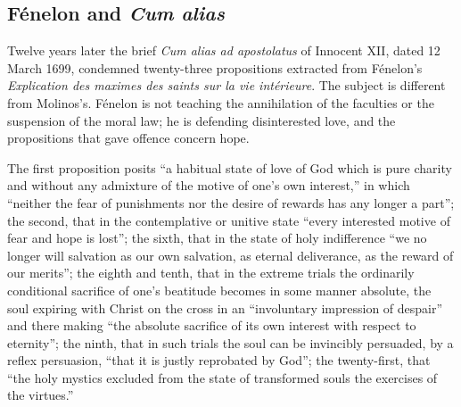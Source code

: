 \subsection{Fénelon and \emph{Cum alias}}

Twelve years later the brief \emph{Cum alias ad apostolatus} of Innocent XII, dated 12 March 1699, condemned twenty-three propositions extracted from Fénelon's \emph{Explication des maximes des saints sur la vie intérieure}. The subject is different from Molinos's. Fénelon is not teaching the annihilation of the faculties or the suspension of the moral law; he is defending disinterested love, and the propositions that gave offence concern hope.

The first proposition posits ``a habitual state of love of God which is pure charity and without any admixture of the motive of one's own interest,'' in which ``neither the fear of punishments nor the desire of rewards has any longer a part''; the second, that in the contemplative or unitive state ``every interested motive of fear and hope is lost''; the sixth, that in the state of holy indifference ``we no longer will salvation as our own salvation, as eternal deliverance, as the reward of our merits''; the eighth and tenth, that in the extreme trials the ordinarily conditional sacrifice of one's beatitude becomes in some manner absolute, the soul expiring with Christ on the cross in an ``involuntary impression of despair'' and there making ``the absolute sacrifice of its own interest with respect to eternity''; the ninth, that in such trials the soul can be invincibly persuaded, by a reflex persuasion, ``that it is justly reprobated by God''; the twenty-first, that ``the holy mystics excluded from the state of transformed souls the exercises of the virtues.''

